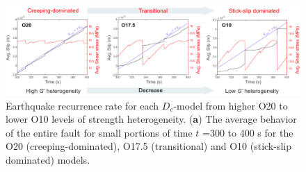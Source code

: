 \documentclass[preprint,1p, 10pt,authoryear]{elsarticle}
\begin{document}


\begin{figure}
    	\centering
	\includegraphics[scale = 0.9]{FIG11_revised.pdf} 
	\caption{Earthquake recurrence rate for each $D_{c}$-model from higher O20 to lower O10 levels of strength heterogeneity. (\textbf{a}) The average behavior of the entire fault for small portions of time $t$ =300 to 400 s for the O20 (creeping-dominated), O17.5 (transitional) and O10 (stick-slip dominated) models.}
	\label{fig11}
\end{figure}
\end{document}
